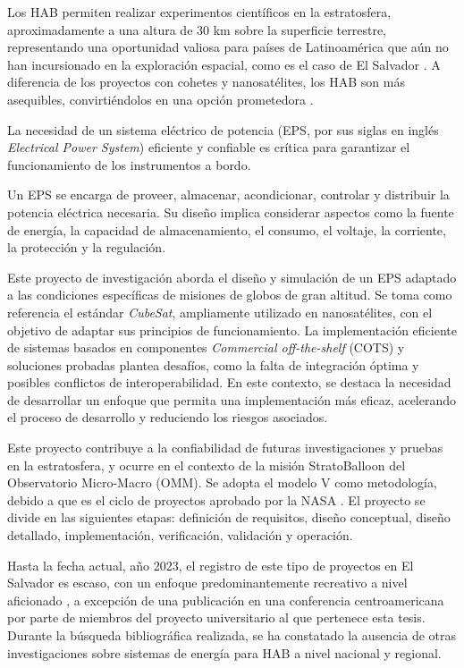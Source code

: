 Los HAB permiten realizar experimentos científicos en la estratosfera, aproximadamente a una altura de 30 km sobre la superficie terrestre, representando una oportunidad valiosa para países de Latinoamérica que aún no han incursionado en la exploración espacial, como es el caso de El Salvador \cite{latam}. A diferencia de los proyectos con cohetes y nanosatélites, los HAB son más asequibles, convirtiéndolos en una opción prometedora \cite{Jarrell2017}.

La necesidad de un sistema eléctrico de potencia (EPS, por sus siglas en inglés \textit{Electrical Power System}) eficiente y confiable es crítica para garantizar el funcionamiento de los instrumentos a bordo.

Un EPS se encarga de proveer, almacenar, acondicionar, controlar y distribuir la potencia eléctrica necesaria. Su diseño implica considerar aspectos como la fuente de energía, la capacidad de almacenamiento, el consumo, el voltaje, la corriente, la protección y la regulación.

Este proyecto de investigación aborda el diseño y simulación de un EPS adaptado a las condiciones específicas de misiones de globos de gran altitud. Se toma como referencia el estándar \emph{CubeSat}, ampliamente utilizado en nanosatélites, con el objetivo de adaptar sus principios de funcionamiento. La implementación eficiente de sistemas basados en componentes \emph{Commercial off-the-shelf} (COTS) y soluciones probadas plantea desafíos, como la falta de integración óptima y posibles conflictos de interoperabilidad. En este contexto, se destaca la necesidad de desarrollar un enfoque que permita una implementación más eficaz, acelerando el proceso de desarrollo y reduciendo los riesgos asociados.

Este proyecto contribuye a la confiabilidad de futuras investigaciones y pruebas en la estratosfera, y ocurre en el contexto de la misión StratoBalloon del Observatorio Micro-Macro (OMM). Se adopta el modelo V como metodología, debido a que es el ciclo de proyectos aprobado por la NASA \cite{NASA2016}. El proyecto se divide en las siguientes etapas: definición de requisitos, diseño conceptual, diseño detallado, implementación, verificación, validación y operación.

Hasta la fecha actual, año 2023, el registro de este tipo de proyectos en El Salvador es escaso, con un enfoque predominantemente recreativo a nivel aficionado \cite{NC}, a excepción de una publicación en una conferencia centroamericana \cite{Reyes2022} por parte de miembros del proyecto universitario al que pertenece esta tesis. Durante la búsqueda bibliográfica realizada, se ha constatado la ausencia de otras investigaciones sobre sistemas de energía para HAB a nivel nacional y regional.


